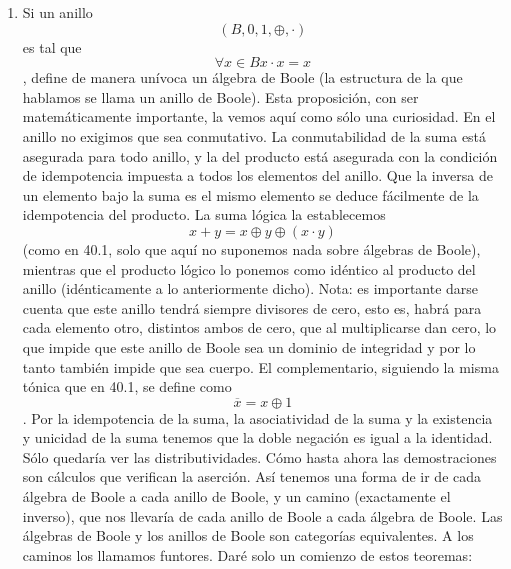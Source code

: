 \documentclass[
]{article}
\begin{document}
\begin{enumerate}
\begin{enumerate}
\begin{enumerate}
\begin{enumerate}
        \[{= {{\lbrack{{({{({a + \overline{b}})} \cdot {({\overline{a} + b})}})} \cdot {({a \cdot b})}}\rbrack} + {\lbrack{{({{({\overline{a} \cdot b})} + {({a \cdot \overline{b}})}})} \cdot {({\overline{a} + \overline{b}})}}\rbrack}}} =\]

        \[{= {{\lbrack{({a + b})}\rbrack} \cdot {\lbrack{({{({\overline{a} + b})} \cdot {({a + \overline{b}})}})}\rbrack}}} =\]

        \[{= {{{({a + b})} \cdot {({\overline{a} + b})}} \cdot {({a + \overline{b}})}}} =\]

        \[{= {{\lbrack{{({a + b})} \cdot {({\overline{a} + b})}}\rbrack} \cdot {\lbrack{{({a + b})} \cdot {({a + \overline{b}})}}\rbrack}}} =\]

        \[{= {{\lbrack b\rbrack} \cdot {\lbrack a\rbrack}}} =\]

        \[= {a \cdot b}\]
      \end{enumerate}
    \item
      Si un anillo \[({B,0,1, \oplus , \cdot})\] es tal que
      \[\forall{x \in B}{{x \cdot x} = x}\], define de manera unívoca un
      álgebra de Boole (la estructura de la que hablamos se llama un
      anillo de Boole). Esta proposición, con ser matemáticamente
      importante, la vemos aquí como sólo una curiosidad. En el anillo
      no exigimos que sea conmutativo. La conmutabilidad de la suma está
      asegurada para todo anillo, y la del producto está asegurada con
      la con\-dición de idempotencia impuesta a todos los elementos del
      anillo. Que la inversa de un elemento bajo la suma es el mismo
      elemento se deduce fácilmente de la idempotencia del producto. La
      suma lógica la establecemos
      \[{{x + y} = x} \oplus y \oplus {({x \cdot y})}\](como en 40.1,
      solo que aquí no su\-ponemos nada sobre álgebras de Boole),
      mientras que el producto lógico lo pone\-mos como idéntico al
      producto del anillo (idénticamente a lo anteriormente dicho).
      Nota: es importante darse cuenta que este anillo tendrá siempre
      divisores de cero, esto es, habrá para cada elemento otro,
      distintos ambos de cero, que al multiplicarse dan cero, lo que
      impide que este anillo de Boole sea un dominio de integridad y por
      lo tanto también impide que sea cuerpo. El complementario,
      siguiendo la misma tó\-nica que en 40.1, se define como
      \[{\overline{x} = x} \oplus 1\]. Por la idempotencia de la suma,
      la asociatividad de la suma y la existencia y unicidad de la suma
      tenemos que la doble negación es igual a la identidad. Sólo
      quedaría ver las distributividades. Cómo hasta ahora las
      demostraciones son cálculos que verifican la aserción. Así tenemos
      una forma de ir de cada álgebra de Boole a cada anillo de Boole, y
      un camino (exacta\-mente el inverso), que nos llevaría de cada
      anillo de Boole a cada álgebra de Boole. Las álgebras de Boole y
      los anillos de Boole son categorías equivalentes. A los ca\-minos
      los llamamos funtores. Daré solo un comienzo de estos teoremas:


\end{enumerate}
\end{enumerate}
\end{enumerate}
\end{document}

